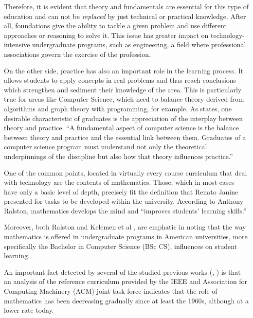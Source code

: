 \documentclass[conference]{IEEEtran}
\begin{document}
	Therefore, it is evident that theory and fundamentals are essential for this type of education and can not be \emph{replaced} by just technical or practical knowledge. After all, foundations give the ability to tackle a given problem and use different approaches or reasoning to solve it. This issue has greater impact on technology-intensive undergraduate programs, such as engineering, a field where professional associations govern the exercise of the profession.

	On the other side, practice has also an important role in the learning process. It allows students to apply concepts in real problems and thus reach conclusions which strengthen and sediment their knowledge of the area. This is particularly true for areas like Computer Science, which need to balance theory derived from algorithms and graph theory with programming, for example. As \cite{cs2008} states, one desirable characteristic of graduates is the appreciation of the interplay between theory and practice. ``A fundamental aspect of computer science is the balance between theory and practice and the essential link between them. Graduates of a computer science program must understand not only the theoretical underpinnings of the discipline but also how that theory influences practice.''

	One of the common points, located in virtually every course curriculum that deal with technology are the contents of mathematics. Those, which in most cases have only a basic level of depth, precisely fit the definition that Renato Janine presented for tasks to be developed within the university. According to Anthony Ralston, mathematics develops the mind and ``improves students' learning skills.'' \cite{ralston:do_need_mathematics}

	Moreover, both Ralston and Kelemen et al \cite{kelemen:has_become_math_phobic}, are emphatic in noting that the way mathematics is offered in undergraduate programs in American universities, more specifically the Bachelor in Computer Science (BSc CS), influences on student learning.

	An important fact detected by several of the studied previous works (\cite{ralston:do_need_mathematics}, \cite{tucker:our_curriculum_math_phobic}) is that an analysis of the reference curriculum provided by the IEEE and Association for Computing Machinery (ACM) joint task-force \cite{cs2001} \cite{cs2008} indicates that the role of mathematics has been decreasing gradually since at least the 1960s, although at a lower rate today.
\end{document}

